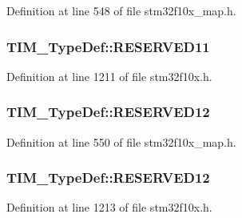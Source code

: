 Definition at line 548 of file stm32f10x\+\_\+map.\+h.

\subsubsection[{\texorpdfstring{R\+E\+S\+E\+R\+V\+E\+D11}{RESERVED11}}]{ T\+I\+M\+\_\+\+Type\+Def\+::\+R\+E\+S\+E\+R\+V\+E\+D11}\hypertarget{struct_t_i_m___type_def_a7a96436f300141eb48768ffa90ee6e71}{}\label{struct_t_i_m___type_def_a7a96436f300141eb48768ffa90ee6e71}


Definition at line 1211 of file stm32f10x.\+h.

\subsubsection[{\texorpdfstring{R\+E\+S\+E\+R\+V\+E\+D12}{RESERVED12}}]{ T\+I\+M\+\_\+\+Type\+Def\+::\+R\+E\+S\+E\+R\+V\+E\+D12}\hypertarget{struct_t_i_m___type_def_a8aae5bd4d1fb9509995d2aa52d976509}{}\label{struct_t_i_m___type_def_a8aae5bd4d1fb9509995d2aa52d976509}


Definition at line 550 of file stm32f10x\+\_\+map.\+h.

\subsubsection[{\texorpdfstring{R\+E\+S\+E\+R\+V\+E\+D12}{RESERVED12}}]{ T\+I\+M\+\_\+\+Type\+Def\+::\+R\+E\+S\+E\+R\+V\+E\+D12}\hypertarget{struct_t_i_m___type_def_a994061b8b26ae9b2e8ddb981cb3eec11}{}\label{struct_t_i_m___type_def_a994061b8b26ae9b2e8ddb981cb3eec11}


Definition at line 1213 of file stm32f10x.\+h.

